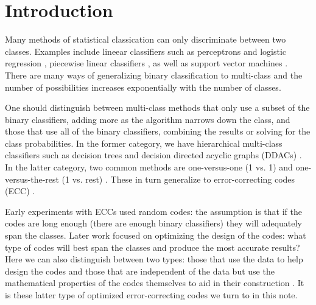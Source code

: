 
\section{Introduction}

Many methods of statistical classication can only discriminate between two classes. 
Examples include lineear classifiers such as perceptrons and logistic regression \citep{Michie_etal1994}, 
piecewise linear classifiers \citep{Herman_Yeung1992,Mills2018},
as well as support vector machines \citep{kernel_intro}.
There are many ways of generalizing binary classification to 
multi-class and the number of possibilities increases exponentially with
the number of classes.

One should distinguish between multi-class methods that only use a subset
of the binary classifiers, adding more as the algorithm narrows down the
class, and those that use all of the binary classifiers, combining the results
or solving for the class probabilities.
In the former category, we have hierarchical multi-class classifiers 
such as decision trees \citep{Cheong_etal2004,Lee_Oh2003} and decision
directed acyclic graphs (DDACs) \citep{Platt_etal2000}.
In the latter category,
two common methods are one-versus-one (1 vs. 1) and one-versus-the-rest (1 vs. rest) \citep{Hsu_Lin2002}.
These in turn generalize to error-correcting codes (ECC) \citep{Dietterich_Bakiri1995}.

Early experiments with ECCs used random codes:
the assumption is that if the codes are long enough (there are enough binary classifiers)
they will adequately span the classes.
Later work focused on optimizing the design of the codes: what type of
codes will best span the classes and produce the most accurate results?
Here we can also distinguish between two types: those that use the data
to help design the codes \citep{Crammer_Singer2002,Zhou_etal2008,Zhong_Cheriet2013}
and those that are independent of the data but use the mathematical 
properties of the codes themselves to aid in their construction \citep{Allwein_etal2000,Windeatt_Ghaderi2002,Zhou_etal2019}.
It is these latter type of optimized error-correcting codes we turn to in this note.

